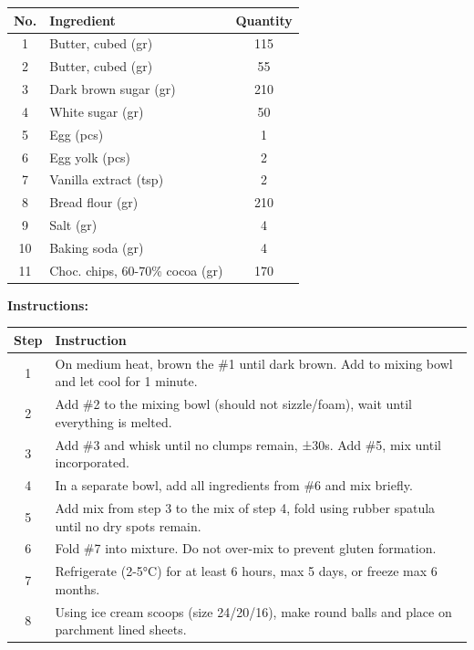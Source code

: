 \begin{center}
\begin{tabular}{|c|l|c|}
    \hline
    \textbf{No.} & \textbf{Ingredient} & \textbf{Quantity} \\
    \hline
    1 & Butter, cubed (gr) & 115 \\
    \hline
    2 & Butter, cubed (gr) & 55 \\
    \hline
    3 & Dark brown sugar (gr) & 210 \\
    \hline
    4 & White sugar (gr) & 50 \\
    \hline
    5 & Egg (pcs) & 1 \\
    \hline
    6 & Egg yolk (pcs) & 2 \\
    \hline
    7 & Vanilla extract (tsp) & 2 \\
    \hline
    8 & Bread flour (gr) & 210 \\
    \hline
    9 & Salt (gr) & 4 \\
    \hline
    10 & Baking soda (gr) & 4 \\
    \hline
    11 & Choc. chips, 60-70\% cocoa (gr) & 170 \\
    \hline
\end{tabular}
\end{center}

\noindent\textbf{Instructions:}
\begin{center}
\begin{tabular}{|c|p{12cm}|}
    \hline
    \textbf{Step} & \textbf{Instruction} \\
    \hline
    1 & On medium heat, brown the \#1 until dark brown. Add to mixing bowl and let cool for 1 minute. \\
    \hline
    2 & Add \#2 to the mixing bowl (should not sizzle/foam), wait until everything is melted. \\
    \hline
    3 & Add \#3 and whisk until no clumps remain, ±30s. Add \#5, mix until incorporated. \\
    \hline
    4 & In a separate bowl, add all ingredients from \#6 and mix briefly. \\
    \hline
    5 & Add mix from step 3 to the mix of step 4, fold using rubber spatula until no dry spots remain. \\
    \hline
    6 & Fold \#7 into mixture. Do not over-mix to prevent gluten formation. \\
    \hline
    7 & Refrigerate (2-5°C) for at least 6 hours, max 5 days, or freeze max 6 months. \\
    \hline
    8 & Using ice cream scoops (size 24/20/16), make round balls and place on parchment lined sheets. \\
    \hline
\end{tabular}
\end{center}

